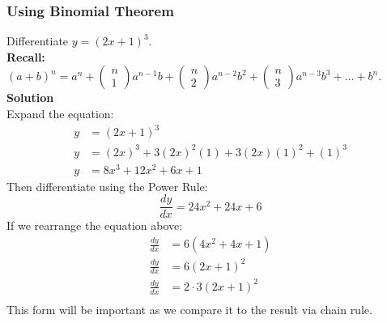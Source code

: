 \documentclass[hidelinks, a4paper, 12pt]{article}
\newcommand{\bd}{\textbf}
\newcommand{\n}{\\[\baselineskip]}
\newcommand{\dydx}{\frac{dy}{dx}}
\begin{document}
            \subsubsection{Using Binomial Theorem}
                Differentiate $y=(2x+1)^3$.\n 
                \bd{Recall:} $(a+b)^n = a^n + \begin{pmatrix}n\\1\end{pmatrix}a^{n-1}b + \begin{pmatrix}n\\2\end{pmatrix}a^{n-2}b^2 + \begin{pmatrix}n\\3\end{pmatrix}a^{n-3}b^3+...+b^n$.\n
                \bd{Solution}\n
                Expand the equation:
                \[\begin{split}
                    y &= (2x+1)^3\\
                    y &= (2x)^3 + 3(2x)^2(1) + 3(2x)(1)^2 + (1)^3\\
                    y &= 8x^3 + 12x^2 + 6x + 1
                \end{split}\]
                Then differentiate using the Power Rule:
                \[\dydx = 24x^2 + 24x + 6\]
                If we rearrange the equation above:
                \[\begin{split}
                    \dydx &= 6(4x^2 + 4x + 1)\\
                    \dydx &= 6(2x+1)^2\\
                    \dydx &= 2 \cdot 3(2x+1)^2\\
                \end{split}\]
                This form will be important as we compare it to the result via chain rule.
\end{document}
